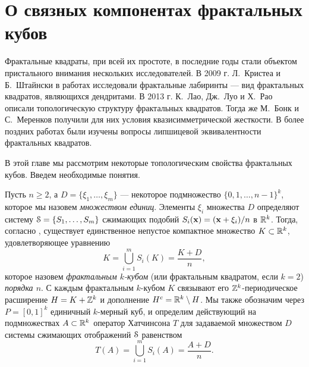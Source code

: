 \chapter{О связных компонентах фрактальных кубов}


Фрактальные квадраты, при всей их простоте, в последние годы стали объектом пристального внимания нескольких исследователей. В 2009 г. Л.~Кристеа и Б.~Штайнски в работах \cite{CS1,CS2} исследовали фрактальные лабиринты  --- вид фрактальных квадратов, являющихся дендритами. В 2013 г. К.~Лао, Дж.~Луо и Х.~Рао \cite{LLR2013} описали топологическую структуру фрактальных квадратов. Тогда же М.~Бонк и С.~Меренков \cite{BM} получили для них условия квазисимметрической жесткости. В более поздних работах \cite{LL,RW} были изучены вопросы липшицевой эквивалентности фрактальных квадратов.

В этой главе мы рассмотрим некоторые топологическим свойства фрактальных кубов.
Введем необходимые понятия.



Пусть $n\geq 2$, а  $ D=\{\xi_1,\ldots,\xi_m\}$ ---  некоторое подмножество  $ \{0,1, \ldots , n-1\}^k$,  которое  мы назовем {\em множеством единиц}. Элементы $\xi_i$ множества $ D$ определяют систему ${\EuScript S}=\{S_1,\ldots,S_m\}$ сжимающих подобий $S_i({\bf{x}})=({\bf{x}}+\xi_i)/n$ в $\mathbb{R}^k$. 
Тогда, согласно  \cite[Theorem(3), p.10]{Hut1981}, существует единственное непустое компактное множество $K\subset \mathbb{R}^k$, удовлетворяющее уравнению 
\begin{equation}\label{Feq} 
K=\bigcup\limits_{i=1}^m S_i(K)=\frac{K+ D}{n},
\end{equation}
которое назовем {\em фрактальным $k$-кубом} (или фрактальным квадратом, если $k=2$) {\em порядка $n$}.
С каждым фрактальным $k$-кубом $K$ связывают его $\mathbb{Z}^k$-периодическое расширение $H=K+\mathbb{Z}^k$  и   дополнение $H^c=\mathbb{R}^k\setminus H$. 
Мы также обозначим через $P=[0,1]^k$ единичный $k$-мерный куб, и  определим действующий на  подмножествах  $A\subset \mathbb{R}^k$  оператор Хатчинсона $T$ для задаваемой множеством $ D$ системы сжимающих отображений ${\EuScript S}$  равенством  
\begin{equation}
T(A)=\bigcup\limits_{i=1}^m S_i(A)=\dfrac{A+ D}{n}.
\end{equation}

